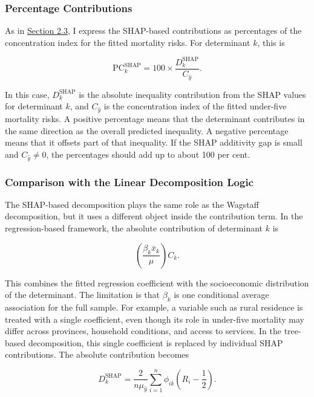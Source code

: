 \documentclass[
  11pt,
  a4paper,
]{article}
\begin{document}
\subsubsection{Percentage
Contributions}\label{sec-shap-percentage-contributions}

As in \hyperref[sec-percentage-contributions]{Section 2.3}, I express
the SHAP-based contributions as percentages of the concentration index
for the fitted mortality risks. For determinant \(k\), this is

\[
\text{PC}_k^{\text{SHAP}} = 100 \times \frac{D_k^{\text{SHAP}}}{C_{\hat{y}}}.
\]

In this case, \(D_k^{\text{SHAP}}\) is the absolute inequality
contribution from the SHAP values for determinant \(k\), and
\(C_{\hat{y}}\) is the concentration index of the fitted under-five
mortality risks. A positive percentage means that the determinant
contributes in the same direction as the overall predicted inequality. A
negative percentage means that it offsets part of that inequality. If
the SHAP additivity gap is small and \(C_{\hat{y}} \neq 0\), the
percentages should add up to about 100 per cent.

\subsubsection{Comparison with the Linear Decomposition
Logic}\label{sec-linear-decomposition-comparison}

The SHAP-based decomposition plays the same role as the Wagstaff
decomposition, but it uses a different object inside the contribution
term. In the regression-based framework, the absolute contribution of
determinant \(k\) is

\[
\left( \frac{\beta_k \bar{x}_k}{\mu} \right) C_k.
\]

This combines the fitted regression coefficient with the socioeconomic
distribution of the determinant. The limitation is that \(\beta_k\) is
one conditional average association for the full sample. For example, a
variable such as rural residence is treated with a single coefficient,
even though its role in under-five mortality may differ across
provinces, household conditions, and access to services. In the
tree-based decomposition, this single coefficient is replaced by
individual SHAP contributions. The absolute contribution becomes

\[
D_k^{\text{SHAP}}
=
\frac{2}{n\mu_{\hat{y}}}
\sum_{i=1}^n
\phi_{ik}
\left(R_i - \frac{1}{2}\right).
\]
\end{document}
